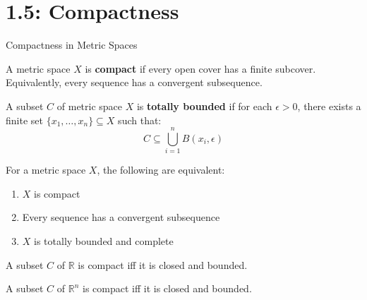 \documentclass[aspectratio=169,10pt]{beamer}
\begin{document}

\section{1.5: Compactness}

\begin{frame}{Compactness in Metric Spaces}
  \begin{definition}
    A metric space $X$ is \textbf{compact} if every open cover has a finite subcover. Equivalently, every sequence has a convergent subsequence.
  \end{definition}

  \vspace{0.3cm}
  \begin{definition}
    A subset $C$ of metric space $X$ is \textbf{totally bounded} if for each $\epsilon > 0$, there exists a finite set $\{x_1, \ldots, x_n\} \subseteq X$ such that:
    $$C \subseteq \bigcup_{i=1}^{n} B(x_i, \epsilon)$$
  \end{definition}

  \vspace{0.3cm}
  \begin{proposition}[Proposition 1.15]
    For a metric space $X$, the following are equivalent:
    \begin{enumerate}
      \item $X$ is compact
      \item Every sequence has a convergent subsequence
      \item $X$ is totally bounded and complete
    \end{enumerate}
  \end{proposition}

  \vspace{0.3cm}
  \begin{theorem}
    A subset $C$ of $\mathbb{R}$ is compact iff it is closed and bounded.
  \end{theorem}

  \vspace{0.2cm}
  \begin{corollary}[Corollary 1.5]
    A subset $C$ of $\mathbb{R}^n$ is compact iff it is closed and bounded.
  \end{corollary}
\end{frame}
\end{document}
